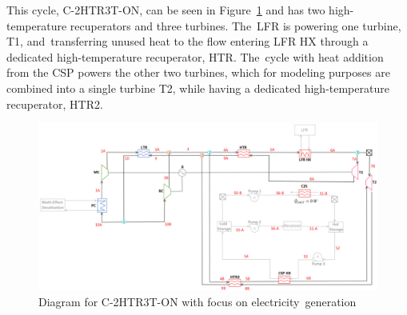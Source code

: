 \documentclass[sustainability,article,accept,moreauthors,pdftex]{Definitions/mdpi}
\begin{document}
\begin{paracol}{2}
This cycle, C-2HTR3T-ON, can be seen in Figure~\ref{c-2htr3t-on} and has two high-temperature recuperators and three turbines. The~LFR is powering one turbine, T1, and~transferring unused heat to the flow entering LFR HX through a dedicated high-temperature recuperator, HTR. The~cycle with heat addition from the CSP powers the other two turbines, which for modeling purposes are combined into a single turbine T2, while having a dedicated high-temperature recuperator, HTR2. 

\end{paracol}
\begin{figure}[H]
  \widefigure
  \includegraphics[width=\linewidth]{Definitions/c-2htr3t-on.pdf}
  \caption{Diagram for C-2HTR3T-ON with focus on electricity~generation\label{c-2htr3t-on}}
\end{figure}
\end{document}
